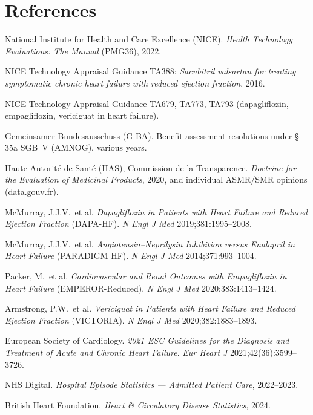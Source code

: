 \documentclass[11pt,a4paper]{article}
\begin{document}
\section*{References}
\begin{enumerate}[leftmargin=1.5em,label={[\arabic*]}]
\small
\item National Institute for Health and Care Excellence (NICE). \emph{Health Technology
Evaluations: The Manual} (PMG36), 2022.
\item NICE Technology Appraisal Guidance TA388: \emph{Sacubitril valsartan for treating
symptomatic chronic heart failure with reduced ejection fraction}, 2016.
\item NICE Technology Appraisal Guidance TA679, TA773, TA793 (dapagliflozin, empagliflozin,
vericiguat in heart failure).
\item Gemeinsamer Bundesausschuss (G-BA). Benefit assessment resolutions under \S\,35a SGB~V
(AMNOG), various years.
\item Haute Autorité de Santé (HAS), Commission de la Transparence. \emph{Doctrine for the
Evaluation of Medicinal Products}, 2020, and individual ASMR/SMR opinions (data.gouv.fr).
\item McMurray, J.J.V.\ et al. \emph{Dapagliflozin in Patients with Heart Failure and Reduced
Ejection Fraction} (DAPA-HF). \emph{N Engl J Med} 2019;381:1995--2008.
\item McMurray, J.J.V.\ et al. \emph{Angiotensin--Neprilysin Inhibition versus Enalapril in Heart
Failure} (PARADIGM-HF). \emph{N Engl J Med} 2014;371:993--1004.
\item Packer, M.\ et al. \emph{Cardiovascular and Renal Outcomes with Empagliflozin in Heart
Failure} (EMPEROR-Reduced). \emph{N Engl J Med} 2020;383:1413--1424.
\item Armstrong, P.W.\ et al. \emph{Vericiguat in Patients with Heart Failure and Reduced Ejection
Fraction} (VICTORIA). \emph{N Engl J Med} 2020;382:1883--1893.
\item European Society of Cardiology. \emph{2021 ESC Guidelines for the Diagnosis and Treatment of
Acute and Chronic Heart Failure}. \emph{Eur Heart J} 2021;42(36):3599--3726.
\item NHS Digital. \emph{Hospital Episode Statistics --- Admitted Patient Care}, 2022--2023.
\item British Heart Foundation. \emph{Heart \& Circulatory Disease Statistics}, 2024.
\end{enumerate}
\end{document}
